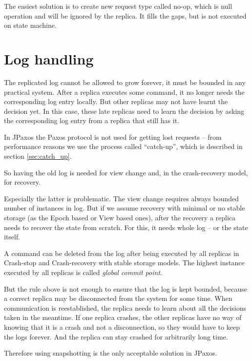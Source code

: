 The easiest solution is to create new request type called no-op, which is null operation and will be ignored by the replica. It fills the gaps, but is not executed on state machine.

\section{Log handling}

The replicated log cannot be allowed to grow forever, it must be bounded in any practical system. After a replica executes some command, it no longer needs the corresponding log entry locally. But other replicas may not have learnt the decision yet. In this case, these late replicas need to learn the decision by asking the corresponding log entry from a replica that still has it.

In JPaxos the Paxos protocol is not used for getting lost requests -- from performance reasons we use the process called ``catch-up'', which is described in section \ref{sec:catch_up}.

So having the old log is needed for view change and, in the crash-recovery model, for recovery.

Especially the latter is problematic. The view change requires always bounded number of instances in log. But if we assume recovery with minimal or no stable storage (as the Epoch based or View based ones), after the recovery a replica needs to recover the state from scratch. For this, it needs whole log -- or the state itself.


A command can be deleted from the log after being executed by all replicas in Crash-stop and Crash-recovery with stable storage models. The highest instance executed by all replicas is called \emph{global commit point}.

But the rule above is not enough to ensure that the log is kept bounded, because a correct replica may be disconnected from the system for some time. When communication is reestablished, the replica needs to learn about all the decisions taken in the meantime. If one replica crashes, the other replicas have no way of knowing that it is a crash and not a disconnection, so they would have to keep the logs forever. And the replica can stay crashed for arbitrarily long time.

Therefore using snapshotting is the only acceptable solution in JPaxos.


